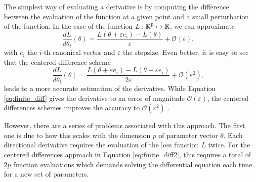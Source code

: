 The simplest way of evaluating a derivative is by computing the difference between the evaluation of the function at a given point and a small perturbation of the function. 
In the case of the function $L : \operatorname{\mathbb{R}}^p \mapsto \operatorname{\mathbb{R}}$, we can approximate
\begin{equation}
 \frac{dL}{d\theta_i} (\theta) = \frac{L(\theta + \varepsilon e_i ) - L(\theta)}{\varepsilon} + \mathcal O (\varepsilon),
 \label{eq:finite_diff}
\end{equation}
with $e_i$ the $i$-th canonical vector and $\varepsilon$ the stepsize. 
Even better, it is easy to see that the centered difference scheme
\begin{equation}
 \frac{dL}{d\theta_i} (\theta) 
 =
 \frac{L(\theta + \varepsilon e_i ) - L(\theta - \varepsilon e_i)}{2\varepsilon}
 + \mathcal O (\varepsilon^2),
 \label{eq:finite_diff2}
\end{equation}
leads to a more accurate estimation of the derivative. 
While Equation \eqref{eq:finite_diff} gives the derivative to an error of magnitude $\mathcal O (\varepsilon)$, the centered differences schemes improves the accuracy to $\mathcal O (\varepsilon^2)$ \cite{ascher2008-numerical-methods}. 
 
However, there are a series of problems associated with this approach.
The first one is due to how this scales with the dimension $p$ of parameter vector $\theta$.
Each directional derivative requires the evaluation of the loss function $L$ twice.
For the centered differences approach in Equation \eqref{eq:finite_diff2}, this requires a total of $2p$ function evaluations which demands solving the differential equation each time for a new set of parameters.

